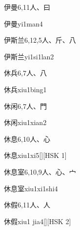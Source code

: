 \begin{entry}{伊曼}{6,11}{⼈、⽈}
  \begin{phonetics}{伊曼}{yi1man4}
  \end{phonetics}
\end{entry}

\begin{entry}{伊斯兰}{6,12,5}{⼈、⽄、⼋}
  \begin{phonetics}{伊斯兰}{yi1si1lan2}
  \end{phonetics}
\end{entry}

\begin{entry}{休兵}{6,7}{⼈、⼋}
  \begin{phonetics}{休兵}{xiu1bing1}
  \end{phonetics}
\end{entry}

\begin{entry}{休闲}{6,7}{⼈、⾨}
  \begin{phonetics}{休闲}{xiu1xian2}
  \end{phonetics}
\end{entry}

\begin{entry}{休息}{6,10}{⼈、⼼}
  \begin{phonetics}{休息}{xiu1xi5}[][HSK 1]
  \end{phonetics}
\end{entry}

\begin{entry}{休息室}{6,10,9}{⼈、⼼、⼧}
  \begin{phonetics}{休息室}{xiu1xi1shi4}
  \end{phonetics}
\end{entry}

\begin{entry}{休假}{6,11}{⼈、⼈}
  \begin{phonetics}{休假}{xiu1 jia4}[][HSK 2]
  \end{phonetics}
\end{entry}

